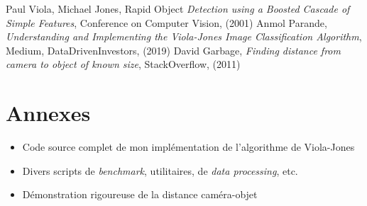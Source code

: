 \documentclass[12pt,a4paper]{article}
\begin{document}
\begin{thebibliography}{9}
    \bibitem{}Paul Viola, Michael Jones, Rapid Object \textit{Detection using a Boosted Cascade of Simple Features}, Conference on Computer Vision, (2001)
    \bibitem{}Anmol Parande, \textit{Understanding and Implementing the Viola-Jones Image Classification Algorithm}, Medium, DataDrivenInvestors, (2019)
    \bibitem{}David Garbage, \textit{Finding distance from camera to object of known size}, StackOverflow, (2011)

\end{thebibliography}

\section*{Annexes}
\begin{itemize}
    \item Code source complet de mon implémentation de l'algorithme de Viola-Jones
    \item Divers scripts de \textit{benchmark}, utilitaires, de \textit{data processing}, etc.
    \item Démonstration rigoureuse de la distance caméra-objet
\end{itemize}
\end{document}
